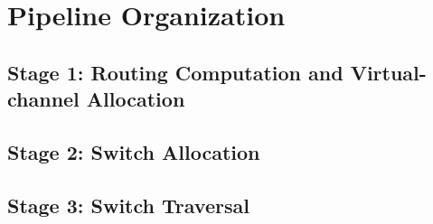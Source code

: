 \section{Pipeline Organization}

\subsection{Stage 1: Routing Computation and Virtual-channel Allocation}

\subsection{Stage 2: Switch Allocation}

\subsection{Stage 3: Switch Traversal}
